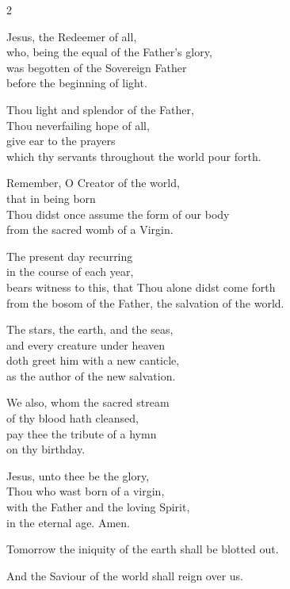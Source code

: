 \documentclass[12pt]{book}
\begin{document}
\begin{multicols}{2}
\begin{enpars}
Jesus, the Redeemer of all,\\
who, being the equal of the Father's glory,\\
was begotten of the Sovereign Father\\
before the beginning of light.

Thou light and splendor of the Father,\\
Thou neverfailing hope of all,\\
give ear to the prayers\\
 which thy servants throughout the world pour forth.
 
Remember, O Creator of the world,\\
that in being born\\
Thou didst once assume the form of our body\\
 from the sacred womb of a Virgin.
 
The present day recurring\\
 in the course of each year,\\
 bears witness to this, that Thou alone didst come forth\\
 from the bosom of the Father, the salvation of the world.
 
The stars, the earth, and the seas,\\
and every creature under heaven\\
doth greet him with a new canticle,\\
as the author of the new salvation.
 
We also, whom the sacred stream\\
 of thy blood hath cleansed,\\pay thee the tribute of a hymn\\
 on thy birthday.
 
Jesus, unto thee be the glory,\\
 Thou who wast born of a virgin,\\
 with the Father and the loving Spirit,\\
 in the eternal age. Amen.

\end{enpars}
\end{multicols}



\begin{enpars} \noindent \vv Tomorrow the iniquity of the earth shall be blotted out.

\noindent \rr And the Saviour of the world shall reign over us.
 \end{enpars}
 
\end{document}
